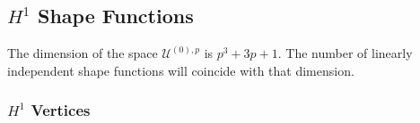 %
%
%
%
% 

\subsection{\texorpdfstring{$H^1$}{H1} Shape Functions}

The dimension of the space $\mathcal{U}^{(0),p}$ is $p^3+3p+1$.
The number of linearly independent shape functions will coincide with that dimension.

\subsubsection {\texorpdfstring{$H^1$}{H1} Vertices}

